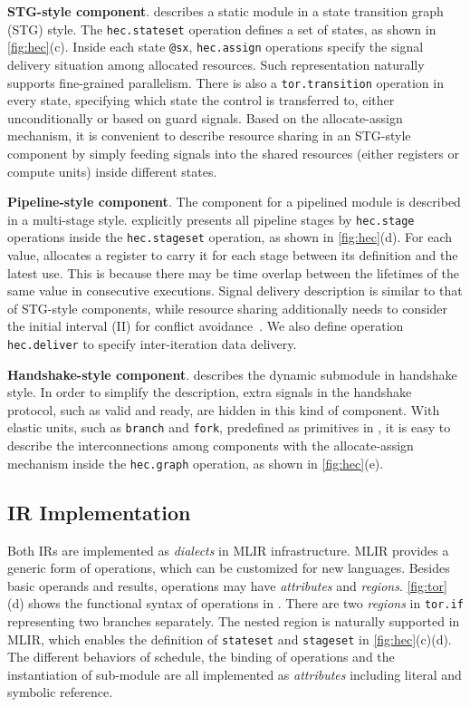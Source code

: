 \textbf{STG-style component}. 
\hec describes a static module in a state transition graph (STG) style. The \verb|hec.stateset| operation defines a set of states, as shown in \autoref{fig:hec}(c). Inside each state \verb|@sx|, \verb|hec.assign| operations specify the signal delivery situation among allocated resources. Such representation naturally supports fine-grained parallelism. There is also a \verb|tor.transition| operation in every state, specifying which state the control is transferred to, either unconditionally or based on guard signals. Based on the allocate-assign mechanism, it is convenient to describe resource sharing in an STG-style component by simply feeding signals into the shared resources (either registers or compute units) inside different states.

\textbf{Pipeline-style component}.
The component for a pipelined module is described in a multi-stage style. \hec explicitly presents all pipeline stages by \verb|hec.stage| operations inside the \verb|hec.stageset| operation, as shown in \autoref{fig:hec}(d). For each value, \hec allocates a register to carry it for each stage between its definition and the latest use. This is because there may be time overlap between the lifetimes of the same value in consecutive executions. Signal delivery description is similar to that of STG-style components, while resource sharing additionally needs to consider the initial interval (II) for conflict avoidance~\cite{sdc-modulo-13, dai_modulo_scheduling}. We also define operation \verb|hec.deliver| to specify inter-iteration data delivery.

\textbf{Handshake-style component}.
\hec describes the dynamic submodule in handshake style. In order to simplify the description, extra signals in the handshake protocol, such as valid and ready, are hidden in this kind of component. With elastic units, such as \verb|branch| and \verb|fork|, predefined as primitives in \hec, it is easy to describe the interconnections among components with the allocate-assign mechanism inside the \verb|hec.graph| operation, as shown in \autoref{fig:hec}(e). 

\subsection{IR Implementation} 
Both IRs are implemented as \emph{dialects} in MLIR infrastructure. MLIR provides a generic form of operations, which can be customized for new languages. Besides basic operands and results, operations may have \emph{attributes} and \emph{regions}. \autoref{fig:tor}(d) shows the functional syntax of operations in \tor. There are two \emph{regions} in \verb|tor.if| representing two branches separately. The nested region is naturally supported in MLIR, which enables the definition of \verb|stateset| and \verb|stageset| in \autoref{fig:hec}(c)(d). The different behaviors of schedule, the binding of operations and the instantiation of sub-module are all implemented as \emph{attributes} including literal and symbolic reference.

